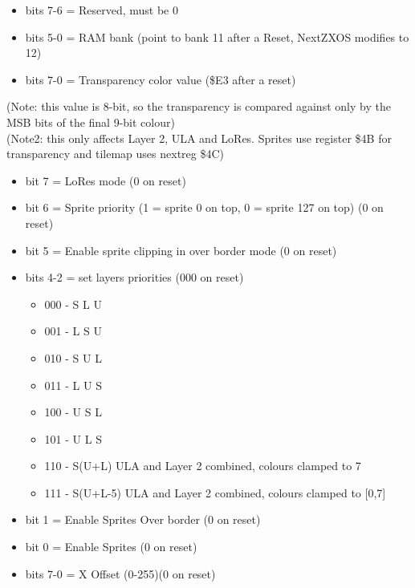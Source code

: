 \begin{itemize}
\item bits 7-6 = Reserved, must be 0
\item bits 5-0 = RAM bank (point to bank 11 after a Reset, NextZXOS
  modifies to 12)
\end{itemize}

\begin{itemize}
\item bits 7-0 = Transparency color value (\$E3 after a reset)
\end{itemize}
(Note: this value is 8-bit, so the transparency is compared against
only by the MSB bits of the final 9-bit colour)\\
(Note2: this only affects Layer 2, ULA and LoRes. Sprites use register
\$4B for transparency and tilemap uses nextreg \$4C)

\begin{itemize}
\item bit 7 = LoRes mode (0 on reset)
\item bit 6 = Sprite priority (1 = sprite 0 on top, 0 = sprite 127 on
  top) (0 on reset)
\item bit 5 = Enable sprite clipping in over border mode (0 on reset)
\item bits 4-2 = set layers priorities (000 on reset)
  \begin{itemize}
  \item 000 - S L U
  \item 001 - L S U
  \item 010 - S U L
  \item 011 - L U S
  \item 100 - U S L
  \item 101 - U L S
  \item 110 - S(U+L) ULA and Layer 2 combined, colours clamped to 7
  \item 111 - S(U+L-5) ULA and Layer 2 combined, colours clamped to [0,7]
  \end{itemize}
\item bit 1 = Enable Sprites Over border (0 on reset)
\item bit 0 = Enable Sprites (0 on reset)
\end{itemize}

\begin{itemize}
\item bits 7-0 = X Offset (0-255)(0 on reset)
\end{itemize}

